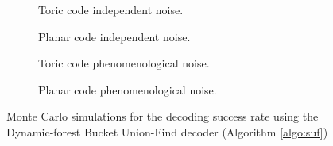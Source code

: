 \begin{figure}[htbp]
  \centering
  \begin{subfigure}[b]{0.49\textwidth}
      \begin{adjustbox}{Clip=0 1em 0 0}
        
      \end{adjustbox}
      \caption{Toric code independent noise.}
  \end{subfigure}
  \begin{subfigure}[b]{0.49\textwidth}
      \begin{adjustbox}{Clip=0 1em 0 0}
        
      \end{adjustbox}
      \caption{Planar code independent noise.}
  \end{subfigure}
  \begin{subfigure}[b]{0.49\textwidth}
      \begin{adjustbox}{Clip=0 1em 0 0}
        
      \end{adjustbox}
      \caption{Toric code phenomenological noise.}
  \end{subfigure}
  \begin{subfigure}[b]{0.49\textwidth}
      \begin{adjustbox}{Clip=0 1em 0 0}
        
      \end{adjustbox}
      \caption{Planar code phenomenological noise.}
  \end{subfigure}
  \caption{Monte Carlo simulations for the decoding success rate using the Dynamic-forest Bucket Union-Find decoder (Algorithm \ref{algo:suf})}
  \label{fig:threshold_dbuf}
\end{figure}


